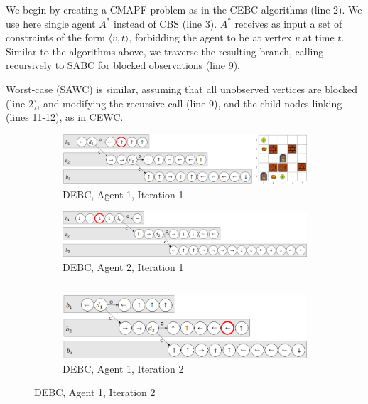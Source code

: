 \documentclass[letterpaper]{article} %
\begin{document}
We begin by creating a CMAPF problem as in the CEBC algorithms (line 2). 
We use here single agent $A^*$ instead of CBS (line 3). $A^*$ receives as input a set of constraints of the form $\langle v, t \rangle$, forbidding the agent to be at vertex $v$ at time $t$. 
Similar to the algorithms above, we traverse the resulting branch, calling recursively to SABC for blocked observations (line 9).

Worst-case (SAWC) is similar, assuming that all unobserved vertices are blocked (line 2), and modifying the recursive call (line 9), and the child nodes linking (lines 11-12), as in CEWC.




\begin{figure}[t]
    \begin{subfigure}[b]{0.4\textwidth}
      \includegraphics[scale=.25]{Figures/DEBC1.1+example.png}
      \caption{DEBC, Agent 1, Iteration 1}
      \label{fig:DEBC1.1}
    \end{subfigure}
    \begin{subfigure}[b]{0.4\textwidth}
      \includegraphics[scale=.25]{Figures/DEBC2.1.png}
      \caption{DEBC, Agent 2, Iteration 1}
      \label{fig:DEBC2.1}
    \end{subfigure}
    \hrule\vspace{5pt}\par
    \begin{subfigure}[b]{0.4\textwidth}
      \includegraphics[scale=.25]{Figures/DEBC1.2.png}
      \caption{DEBC, Agent 1, Iteration 2}
      \label{fig:DEBC1.2}
    \end{subfigure}

\end{figure}
\end{document}
